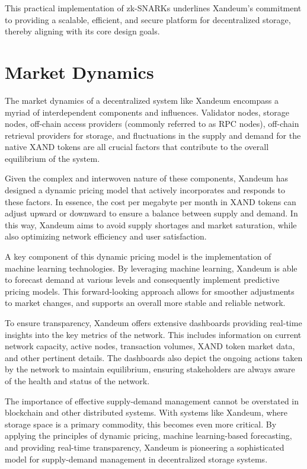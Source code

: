 \documentclass[11 pt]{article}   	%
\let\oldsection\section
\renewcommand{\section}{\clearpage\oldsection}
\begin{document}
This practical implementation of zk-SNARKs underlines Xandeum's commitment to providing a scalable, efficient, and secure platform for decentralized storage, thereby aligning with its core design goals.

\section{Market Dynamics}
The market dynamics of a decentralized system like Xandeum encompass a myriad of interdependent components and influences. Validator nodes, storage nodes, off-chain access providers (commonly referred to as RPC nodes), off-chain retrieval providers for storage, and fluctuations in the supply and demand for the native XAND tokens are all crucial factors that contribute to the overall equilibrium of the system.

Given the complex and interwoven nature of these components, Xandeum has designed a dynamic pricing model that actively incorporates and responds to these factors. In essence, the cost per megabyte per month in XAND tokens can adjust upward or downward to ensure a balance between supply and demand. In this way, Xandeum aims to avoid supply shortages and market saturation, while also optimizing network efficiency and user satisfaction.

A key component of this dynamic pricing model is the implementation of machine learning technologies. By leveraging machine learning, Xandeum is able to forecast demand at various levels and consequently implement predictive pricing models. This forward-looking approach allows for smoother adjustments to market changes, and supports an overall more stable and reliable network.

To ensure transparency, Xandeum offers extensive dashboards providing real-time insights into the key metrics of the network. This includes information on current network capacity, active nodes, transaction volumes, XAND token market data, and other pertinent details. The dashboards also depict the ongoing actions taken by the network to maintain equilibrium, ensuring stakeholders are always aware of the health and status of the network.

The importance of effective supply-demand management cannot be overstated in blockchain and other distributed systems. With systems like Xandeum, where storage space is a primary commodity, this becomes even more critical. By applying the principles of dynamic pricing, machine learning-based forecasting, and providing real-time transparency, Xandeum is pioneering a sophisticated model for supply-demand management in decentralized storage systems.
\end{document}
